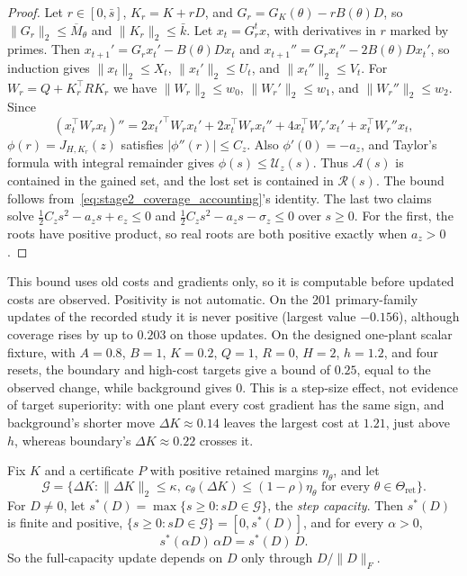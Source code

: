 \begin{proof}
Let $r\in[0,\bar s]$, $K_r=K+rD$, and $G_r=G_K(\theta)-rB(\theta)D$, so
$\|G_r\|_2\le\overline M_\theta$ and $\|K_r\|_2\le\bar k$. Let $x_t=G_r^tx$, with
derivatives in $r$ marked by primes. Then
$x_{t+1}'=G_rx_t'-B(\theta)Dx_t$ and
$x_{t+1}''=G_rx_t''-2B(\theta)Dx_t'$, so induction gives $\|x_t\|_2\le X_t$,
$\|x_t'\|_2\le U_t$, and $\|x_t''\|_2\le V_t$. For $W_r=Q+K_r^\top RK_r$ we have
$\|W_r\|_2\le w_0$, $\|W_r'\|_2\le w_1$, and $\|W_r''\|_2\le w_2$. Since
\[
 (x_t^\top W_rx_t)''=2x_t'^\top W_rx_t'+2x_t^\top W_rx_t''
 +4x_t^\top W_r'x_t'+x_t^\top W_r''x_t,
\]
$\phi(r)=J_{H,K_r}(z)$ satisfies $|\phi''(r)|\le C_z$. Also $\phi'(0)=-a_z$, and
Taylor's formula with integral remainder gives
$\phi(s)\le\mathcal U_z(s)$. Thus $\mathcal A(s)$ is contained in the gained set, and
the lost set is contained in $\mathcal R(s)$. The bound follows
from~\eqref{eq:stage2_coverage_accounting}'s identity. The last two claims solve
$\tfrac12C_zs^2-a_zs+e_z\le0$ and $\tfrac12C_zs^2-a_zs-\sigma_z\le0$ over $s\ge0$.
For the first, the roots have positive product, so real roots are both positive
exactly when $a_z>0$.
\end{proof}

This bound uses old costs and gradients only, so it is computable before updated
costs are observed. Positivity is not automatic. On the 201 primary-family updates of
the recorded study it is never positive (largest value $-0.156$), although coverage
rises by up to $0.203$ on those updates. On the designed one-plant scalar fixture,
with $A=0.8$, $B=1$, $K=0.2$, $Q=1$, $R=0$, $H=2$, $h=1.2$, and four resets, the
boundary and high-cost targets give a bound of $0.25$, equal to the observed change,
while background gives $0$. This is a step-size effect, not evidence of target
superiority: with one plant every cost gradient has the same sign, and background's
shorter move $\Delta K\approx0.14$ leaves the largest cost at $1.21$, just above $h$,
whereas boundary's $\Delta K\approx0.22$ crosses it.

\begin{proposition}
\label{prop:stage3_direction}
Fix $K$ and a certificate $P$ with positive retained margins $\eta_\theta$, and let
\[
 \mathcal G=\{\Delta K:\|\Delta K\|_2\le\kappa,\
 c_\theta(\Delta K)\le(1-\rho)\eta_\theta
 \text{ for every }\theta\in\Theta_{\mathrm{ret}}\}.
\]
For $D\ne0$, let $s^*(D)=\max\{s\ge0:sD\in\mathcal G\}$, the \emph{step capacity}.
Then $s^*(D)$ is finite and positive, $\{s\ge0:sD\in\mathcal G\}=[0,s^*(D)]$, and for
every $\alpha>0$,
\[
 s^*(\alpha D)\,\alpha D=s^*(D)\,D.
\]
So the full-capacity update depends on $D$ only through $D/\|D\|_F$.
\end{proposition}

